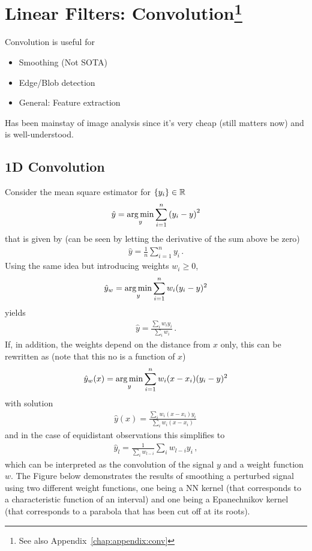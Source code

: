\section[Convolution]{Linear Filters: Convolution\footnote{See also
    Appendix~\ref{chap:appendix:conv}}}
Convolution is useful for
\begin{itemize}
\item Smoothing (Not SOTA)
\item Edge/Blob detection
\item General: Feature extraction
\end{itemize}
Has been mainstay of image analysis since it's very cheap (still
matters now) and is well-understood.

\subsection*{1D Convolution}
Consider the mean square estimator for $\{y_i\} \in \mathbb{R}$
\begin{gather*}
  \hat{y} = \operatorname*{arg\,min}_y \sum_{i=1}^{n}{(y_i - y)}^2
\end{gather*}
that is given by (can be seen by letting the derivative of the sum above be
zero)
\begin{gather*}
  \hat{y} = \frac{1}{n} \sum_{i=1}^n y_i \,.
\end{gather*}
Using the same idea but introducing weights $w_i \ge 0$, \ie
\begin{gather*}
  \hat{y}_w = \operatorname*{arg\,min}_y \sum_{i=1}^n w_i (y_i - y)^2
\end{gather*}
yields
\begin{gather*}
  \hat{y} = \frac{\sum_i w_i y_i}{\sum_i w_i}\,.
\end{gather*}
If, in addition, the weights depend on the distance from $x$ only, this can be
rewritten as (note that this no is a function of $x$)
\begin{gather*}
  \hat{y}_w(x) = \operatorname*{arg\,min}_y \sum_{i=1}^n w_i(x - x_i) (y_i - y)^2
\end{gather*}
with solution
\begin{gather*}
  \hat{y}(x) = \frac{\sum_i w_i(x- x_i) y_i}{\sum_i w_i(x - x_i)}\,
\end{gather*}
and in the case of equidistant observations this simplifies to
\begin{gather*}
  \hat{y}_l = \frac{1}{\sum_i w_{l-i}}\sum_i w_{l-i} y_i\,,
\end{gather*}
which can be interpreted as the convolution of the signal $y$ and a weight
function $w$. The Figure below demonstrates the results of smoothing a perturbed
signal using two different weight functions, one being a NN kernel (that
corresponds to a characteristic function of an interval) and one being a
Epanechnikov kernel (that corresponds to a parabola that has been cut off at its
roots).

